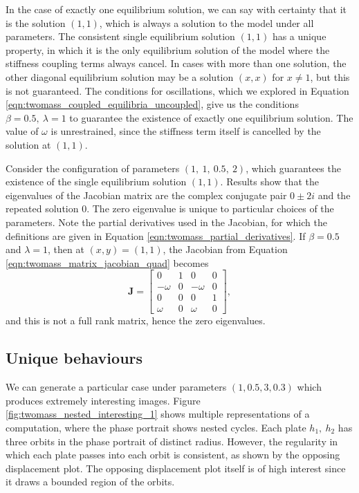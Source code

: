 In the case of exactly one equilibrium solution,
we can say with certainty that it is the solution \((1,1)\),
which is always a solution to the model under all parameters.
The consistent single equilibrium solution \((1,1)\) has a unique property,
in which it is the only equilibrium solution of the model where the stiffness coupling terms always cancel.
In cases with more than one solution, the other diagonal equilibrium solution may be a solution \((x,x)\) for $x \neq 1$,
but this is not guaranteed.
The conditions for oscillations,
which we explored in Equation \ref{eqn:twomass_coupled_equilibria_uncoupled},
give us the conditions \(\beta=0.5,~\lambda=1\) to guarantee the existence of exactly one equilibrium solution.
The value of $\omega$ is unrestrained, since the stiffness term itself is cancelled by the solution at \((1,1)\).

Consider the configuration of parameters \((1,~1,~0.5,~2)\),
which guarantees the existence of the single equilibrium solution \((1,1)\).
Results show that the eigenvalues of the Jacobian matrix are the complex conjugate pair $ 0 \pm 2i$ and the repeated solution $0$.  %
The zero eigenvalue is unique to particular choices of the parameters.
Note the partial derivatives used in the Jacobian, for which the definitions are given in Equation \ref{eqn:twomass_partial_derivatives}.
If $\beta = 0.5$ and $\lambda = 1$, then at \((x,y) = (1,1)\),
the Jacobian from Equation \ref{eqn:twomass_matrix_jacobian_quad} becomes
\begin{equation*}
	\mathbf{J} = \begin{bmatrix}
		0 & 1 & 0 & 0 \\
		-\omega & 0 & -\omega & 0 \\
		0 & 0 & 0 & 1 \\
		\omega & 0 & \omega & 0
	\end{bmatrix},
\end{equation*}
and this is not a full rank matrix, hence the zero eigenvalues.

\subsection{Unique behaviours}

We can generate a particular case under parameters \((1,0.5,3,0.3)\) which produces extremely interesting images.
Figure \ref{fig:twomass_nested_interesting_1} shows multiple representations of a computation,
where the phase portrait shows nested cycles.
Each plate $h_1,~h_2$ has three orbits in the phase portrait of distinct radius.
However, the regularity in which each plate passes into each orbit is consistent,
as shown by the opposing displacement plot.
The opposing displacement plot itself is of high interest since it draws a bounded region of the orbits.

